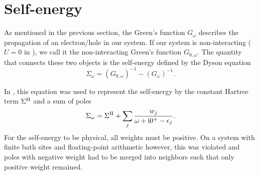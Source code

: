 \section{Self-energy}

As mentioned in the previous section,
the Green's function $G_\omega$ describes the propagation of an electron/hole in our system.
If our system is non-interacting ($U=0$ in ),
we call it the non-interacting Green's function $G_{0, \omega}$.
The quantity that connects these two objects is the self-energy defined by the Dyson equation
\begin{equation}
    \Sigma_\omega = (G_{0, \omega})^{-1} - (G_\omega)^{-1}.
    \label{eq:dyson}
\end{equation}

In \cite{Lu2014},
this equation was used to represent the self-energy by the constant Hartree term $\Sigma^{\mathrm{H}}$
and a sum of poles
\begin{equation}
    \Sigma_\omega = \Sigma^{\mathrm{H}} + \sum_j \frac{w_j}{\omega + \mathrm{i}0^+ - \epsilon_j}.
    \label{eq:self-energy-sum-of-poles}
\end{equation}
For the self-energy to be physical, all weights must be positive.
On a system with finite bath sites and floating-point arithmetic however,
this was violated and poles with negative weight had to be merged into neighbors
such that only positive weight remained.

